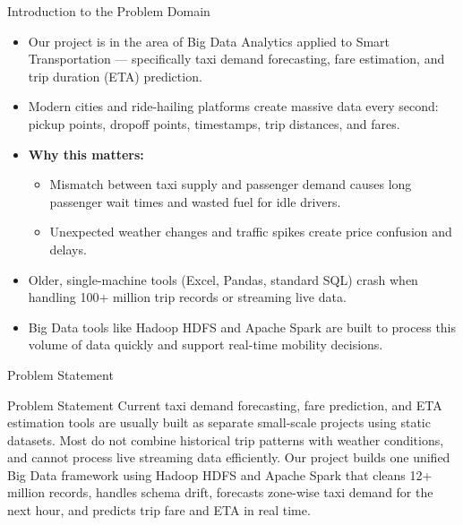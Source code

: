\documentclass[aspectratio=169]{beamer}
\begin{document}
\begin{frame}{Introduction to the Problem Domain}
  \begin{itemize}
    \item Our project is in the area of Big Data Analytics applied to Smart Transportation --- specifically taxi demand forecasting, fare estimation, and trip duration (ETA) prediction.
    \item Modern cities and ride-hailing platforms create massive data every second: pickup points, dropoff points, timestamps, trip distances, and fares.
    \item \textbf{Why this matters:}
      \begin{itemize}
        \item Mismatch between taxi supply and passenger demand causes long passenger wait times and wasted fuel for idle drivers.
        \item Unexpected weather changes and traffic spikes create price confusion and delays.
      \end{itemize}
    \item Older, single-machine tools (Excel, Pandas, standard SQL) crash when handling 100+ million trip records or streaming live data.
    \item Big Data tools like Hadoop HDFS and Apache Spark are built to process this volume of data quickly and support real-time mobility decisions.
  \end{itemize}
\end{frame}

\begin{frame}{Problem Statement}
  \begin{block}{Problem Statement}
    Current taxi demand forecasting, fare prediction, and ETA estimation tools are usually built as separate small-scale projects using static datasets. Most do not combine historical trip patterns with weather conditions, and cannot process live streaming data efficiently. Our project builds one unified Big Data framework using Hadoop HDFS and Apache Spark that cleans 12+ million records, handles schema drift, forecasts zone-wise taxi demand for the next hour, and predicts trip fare and ETA in real time.
  \end{block}
\end{frame}
\end{document}
